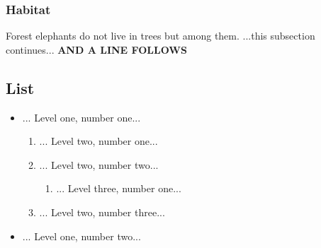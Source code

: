 \documentclass{article}
\begin{document}
\subsubsection{Habitat}
\par Forest elephants do not live in trees but among them.
...this subsection continues...  \textbf{AND A LINE FOLLOWS}
\subsection{List}
\begin{itemize}
\item ... Level one, number one...
\begin{enumerate}
\item ... Level two, number one...
\item ... Level two, number two...
\begin{enumerate}
\item ... Level three, number one...
\end{enumerate}
\item ... Level two, number three...
\end{enumerate}
\item ... Level one, number two...
\end{itemize}
\end{document}
